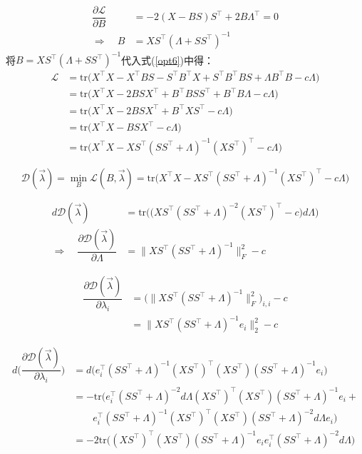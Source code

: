 \begin{align}
  \dfrac{\partial \mathcal{L}}{\partial B}&=-2(X-BS)S^{\top}+2 B\Lambda ^{\top}=0\\ \Rightarrow \quad B&=XS^{\top}(\Lambda+SS^{\top})^{-1}
\end{align}
将$B=XS^{\top}(\Lambda+SS^{\top})^{-1}$代入式(\ref{opt6})中得：
\begin{align*}
  \mathcal{L} & =\text{tr}\Big(X^{\top}X-X^{\top}BS-S^{\top}B^{\top}X+S^{\top}B^{\top}BS
+\Lambda B^{\top}B-c\Lambda\Big) \\
   & =\text{tr}\Big(X^{\top}X-2BSX^{\top}+B^{\top}BSS^{\top}
+ B^{\top}B\Lambda-c\Lambda\Big) \\
   &= \text{tr}\Big(X^{\top}X-2BSX^{\top}+B^{\top}XS^{\top}-c\Lambda\Big)\\
&= \text{tr}\Big(X^{\top}X-BSX^{\top}-c\Lambda\Big)\\
&=\text{tr}\Big(X^{\top}X-XS^{\top}(SS^{\top}+\Lambda)^{-1}
(XS^{\top})^{\top}-c\Lambda\Big)
\end{align*}

\begin{equation}\label{Dlambda}
  \mathcal{D}(\vec{\lambda})=\min\limits_B   \mathcal{L}(B,\vec{\lambda})=
\text{tr}\Big(X^{\top}X-XS^{\top}(SS^{\top}+\Lambda)^{-1}
(XS^{\top})^{\top}-c\Lambda\Big)
\end{equation}

\begin{align}
  d\mathcal{D}(\vec{\lambda})&=\text{tr}\Big(\big(XS^{\top}(SS^{\top}+\Lambda)^{-2}
(XS^{\top})^{\top}-c\big)d\Lambda\Big)\\
\Rightarrow\quad \dfrac{\partial\mathcal{D}(\vec{\lambda})}{\partial \Lambda}&=\|XS^{\top}(SS^{\top}+\Lambda)^{-1}\|_F^2-c
\end{align}

\begin{align}\label{grad}
   \dfrac{\partial\mathcal{D}(\vec{\lambda})}{\partial \lambda_i}&=\Big(\|XS^{\top}(SS^{\top}+\Lambda)^{-1}\|_F ^2\Big)_{i,i}-c\nonumber\\
&=\|XS^{\top}(SS^{\top}+\Lambda)^{-1}e_i\|_2^2-c
\end{align}

\begin{align*}
d\Big(\dfrac{\partial\mathcal{D}(\vec{\lambda})}{\partial \lambda_i}\Big)&=d\Big(e_i^{\top}(SS^{\top}+\Lambda)^{-1}(XS^{\top})^{\top}(XS^{\top})(SS^{\top}+\Lambda)^{-1}e_i\Big)\\
&=-\text{tr}\Big(e_i^{\top}(SS^{\top}+\Lambda)^{-2}d\Lambda(XS^{\top})^{\top}(XS^{\top})(SS^{\top}+\Lambda)^{-1}e_i+\\
&\qquad e_i^{\top}(SS^{\top}+\Lambda)^{-1}(XS^{\top})^{\top}(XS^{\top})(SS^{\top}+\Lambda)^{-2}d\Lambda e_i\Big)\\
&=-2\text{tr}\Big((XS^{\top})^{\top}(XS^{\top})(SS^{\top}+\Lambda)^{-1}e_ie_i^{\top}(SS^{\top}+\Lambda)^{-2}d\Lambda \Big)
\end{align*}

